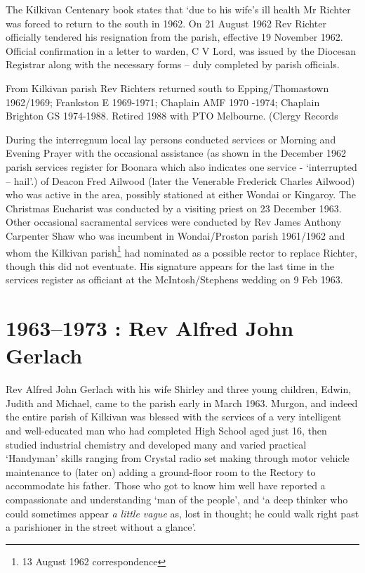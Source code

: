 The Kilkivan Centenary book states that `due to his wife's ill health Mr Richter was forced to return to the south in 1962. On 21 August 1962 Rev Richter officially tendered his resignation from the parish, effective 19 November 1962. Official confirmation in a letter to warden, C V Lord, was issued by the Diocesan Registrar along with the necessary forms -- duly completed by parish officials.

From Kilkivan parish Rev Richters returned south to Epping/Thomastown 1962/1969; Frankston E 1969-1971; Chaplain AMF 1970 -1974; Chaplain Brighton GS 1974-1988. Retired 1988 with PTO Melbourne. (Clergy Records

During the interregnum local lay persons conducted services or Morning and Evening Prayer with the occasional assistance (as shown in the December 1962 parish services register for Boonara which also indicates one service - `interrupted -- hail'.) of Deacon Fred Ailwood (later the Venerable Frederick Charles Ailwood) who was active in the area, possibly stationed at either Wondai or Kingaroy. The Christmas Eucharist was conducted by a visiting priest on 23 December 1963. Other occasional sacramental services were conducted by Rev James Anthony Carpenter Shaw who was incumbent in Wondai/Proston parish 1961/1962 and whom the Kilkivan parish\footnote{13 August 1962 correspondence} had nominated as a possible rector to replace Richter, though this did not eventuate. His signature appears for the last time in the services register as officiant at the McIntosh/Stephens wedding on 9 Feb 1963.

\hypertarget{rev-alfred-john-gerlach}{%
\chapter{1963--1973 : Rev Alfred John Gerlach}\label{rev-alfred-john-gerlach}}

Rev Alfred John Gerlach with his wife Shirley and three young children, Edwin, Judith and Michael, came to the parish early in March 1963. Murgon, and indeed the entire parish of Kilkivan was blessed with the services of a very intelligent and well-educated man who had completed High School aged just 16, then studied industrial chemistry and developed many and varied practical `Handyman' skills ranging from Crystal radio set making through motor vehicle maintenance to (later on) adding a ground-floor room to the Rectory to accommodate his father. Those who got to know him well have reported a compassionate and understanding `man of the people', and `a deep thinker who could sometimes appear \emph{a little vague} as, lost in thought; he could walk right past a parishioner in the street without a glance'.

